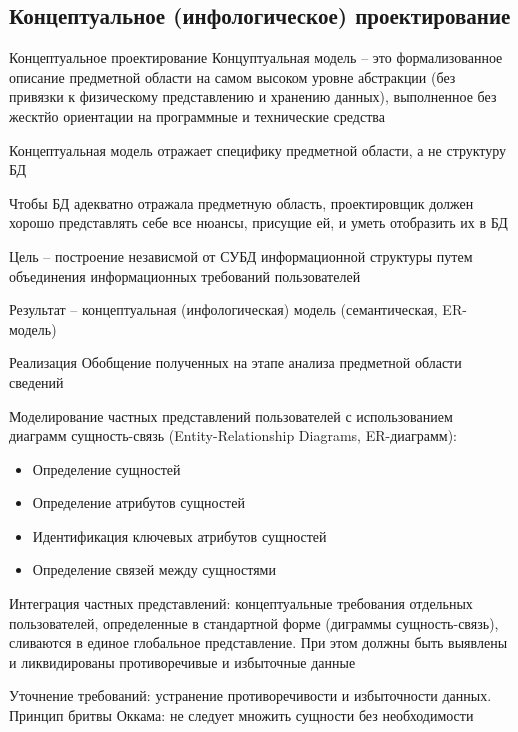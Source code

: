 \documentclass[12pt]{article}
\begin{document}
\newpage

\subsection{Концептуальное (инфологическое) проектирование}

\begin{defin}{Концептуальное проектирование}
    Концуптуальная модель -- это формализованное описание предметной области на самом высоком уровне абстракции (без привязки к физическому представлению и хранению данных), выполненное без жесктйо ориентации на программные и технические средства 

    Концептуальная модель отражает специфику предметной области, а не структуру БД 

    Чтобы БД адекватно отражала предметную область, проектировщик должен хорошо представлять себе все нюансы, присущие ей, и уметь отобразить их в БД 

    Цель -- построение независмой от СУБД информационной структуры путем объединения информационных требований пользователей 

    Результат -- концептуальная (инфологическая) модель (семантическая, ER-модель)
\end{defin}

\begin{nota}{Реализация}
    Обобщение полученных на этапе анализа предметной области сведений 

    Моделирование частных представлений пользователей с использованием диаграмм сущность-связь (Entity-Relationship Diagrams, ER-диаграмм):

    \begin{itemize}
        \item Определение сущностей 
        \item Определение атрибутов сущностей 
        \item Идентификация ключевых атрибутов сущностей 
        \item Определение связей между сущностями 
    \end{itemize}

    Интеграция частных представлений: концептуальные требования отдельных пользователей, определенные в стандартной форме (диграммы сущность-связь), сливаются в единое глобальное представление. При этом должны быть выявлены и ликвидированы противоречивые и избыточные данные 

    Уточнение требований: устранение противоречивости и избыточности данных. Принцип бритвы Оккама: не следует множить сущности без необходимости 
\end{nota}
\end{document}
